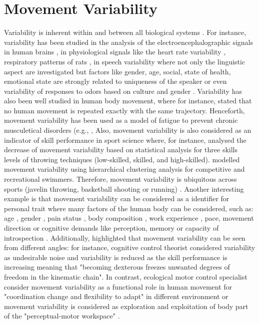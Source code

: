 \section{Movement Variability}
Variability is inherent within and between all biological systems \cite{newell1993}.
For instance, variability has been studied in the analysis of the electroencephalographic 
signals in human brains \cite{klonowski2007}, in physiological signals like the heart 
rate variability \cite{schumacher2004, acharya2006}, respiratory patterns of rats \cite{dhingra2011}, 
in speech variability where not only the linguistic aspect are investigated but 
factors like gender, age, social, state of health, emotional state are
strongly related to uniqueness of the speaker \cite{benzeghiba2007}
or even variability of responses to odors based on culture and gender \cite{ferdenzi2013}.
Variability has also been well studied in human body movement, where 
for instance, \cite{bernstein1967} stated that no human movement is repeated exactly 
with the same trajectory.
Henceforth, movement variability has been used 
as a model of fatigue to prevent 
chronic musculetical disorders (e.g.,  \cite{mathiassen2006, srinivasan2012},
Also, movement variability is also considered as an indicator of skill performance
in sport science where, for instance, \cite{wagner2012} analysed the decrease of movement 
variability based on statistical analysis for three skills levels of 
throwing techniques (low-skilled, skilled, and high-skilled).
\cite{seifert2011} modelled movement variability using hierarchical clustering 
analysis for competitive and recreational swimmers.
Therefore, movement variability is ubiquitous across sports 
(javelin throwing, basketball shooting or running) \cite{bartlett2007}.
Another interesting example is that movement variability can be considered as a 
identifier for personal trait \cite{sandlund2017} where many factors 
of the human body can be considered, such as:
age \cite{kruger2013, macdonald2006, vaillancourt2003, stergiou2016},
gender \cite{svendsen2010},
pain status \cite{madeleine2008, sandlund2008},
body composition  \cite{chiari2002},
work experience \cite{madeleine2009},
pace, movement direction or cognitive demands  
like perception, memory or capacity of introspection \cite{srinivasan2012, kanai2011}.
Additionally, \cite{bartlett2007} highlighted that movement variability can be 
seen from different angles: for instance, cognitive control theorist considered 
variability as undesirable noise and variability is reduced as the skill performance 
is increasing meaning that "becoming dexterous freezes unwanted degrees of freedom 
in the kinematic chain".
In contrast, ecological motor control specialist consider movement variability 
as a functional role in human movement for "coordination change and flexibility to adapt" 
in different environment or movement variability is considered as exploration
and exploitation of body part of the "perceptual-motor workspace" \cite{wu2014, herzfeld2014}.

